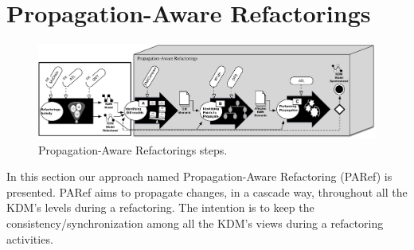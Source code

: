 %
\section{Propagation-Aware Refactorings} %
\label{sec:the_approach}

\begin{figure}[t]
	\centering
	\includegraphics[scale=0.545]{figuras/NewStepsApproach2}
	\caption{Propagation-Aware Refactorings steps.}
	\label{fig:approach}
\end{figure}

In this section our approach named Propagation-Aware Refactoring (PARef) is presented. PARef aims to propagate changes, in a cascade way, throughout all the KDM's levels during a refactoring. The intention is to keep the consistency/synchronization among all the KDM's views during a refactoring activities.


